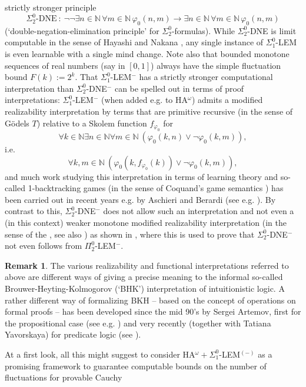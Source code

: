 \documentclass[1p]{elsarticle}
\newcommand{\NN}{\ensuremath{\mathbb{N}}}
\theoremstyle{plain}
\theoremstyle{definition}
\newtheorem{rmk}[thm]{Remark}
\theoremstyle{remark}
\theoremstyle{definition}
\begin{document}
strictly stronger principle 
\[ \Sigma^0_2\mbox{-DNE}\ :\ \neg\neg\exists n\in\NN\,\forall m\in\NN\,
\varphi_0(n,m)\to\exists n\in\NN\,\forall m\in\NN\,\varphi_0(n,m) \]
(`double-negation-elimination principle' for 
$\Sigma^0_2$-formulas). While $\Sigma^0_2$-DNE is limit computable in the 
sense of Hayashi and 
Nakana \cite{Hayashi/Nakata}, 
any single instance of $\Sigma^0_1$-LEM is even learnable 
with a single mind change. Note also that bounded monotone sequences of 
real numbers (say in $[0,1]$) always have the simple fluctuation bound 
$F(k):=2^k.$ That $\Sigma^0_1$-LEM$^-$ has a strictly stronger 
computational interpretation than $\Sigma^0_2$-DNE$^-$ can be spelled 
out in terms of proof interpretations:  $\Sigma^0_1$-LEM$^-$ (when added 
e.g. to HA$^{\omega}$) admits  
a modified realizability interpretation 
by terms that are primitive recursive (in the 
sense of G\"odels $T$) relative to a Skolem function $f_{\varphi_0}$ for 
\[ \forall k\in\NN\exists n \in\NN\forall m\in\NN 
\ (\varphi_0(k,n)\vee\neg\varphi_0(k,m)),\]
i.e. 
\[ \forall k,m\in\NN 
\ (\varphi_0(k,f_{\varphi_0}(k))\vee\neg\varphi_0(k,m)),  \] 
and much work studying this interpretation in terms of learning 
theory and so-called 1-backtracking games (in the sense of 
Coquand's game semantics \cite{Coquand,Berardi/Coquand/Hayashi}) 
has been carried out in recent years e.g. by 
Aschieri and Berardi (see e.g. 
\cite{Aschieri/Berardi,Aschieri1,Aschieri2}). By contrast to this, 
$\Sigma^0_2$-DNE$^-$ does not allow such an interpretation and not 
even a (in this context) weaker monotone modified realizability 
interpretation (in the sense of the \cite{Kohlenbach(relative)}, 
see also \cite{Kohlenbach(book)}) as shown in \cite{Akama}, where this 
is used to prove that $\Sigma^0_2$-DNE$^-$ not even follows from 
$\Pi^0_2$-LEM$^-$. 
\begin{rmk} The various realizability and functional interpretations 
referred to above are different ways of giving a precise meaning to the 
informal so-called Brouwer-Heyting-Kolmogorov (`BHK') 
interpretation of intuitionistic 
logic. A rather different way of formalizing BKH -- based on the concept 
of operations on formal proofs -- has been developed since 
the mid 90's by Sergei Artemov, first for the propositional case (see 
e.g. \cite{Artemov}) and very recently (together with 
Tatiana Yavorskaya) for predicate logic (see \cite{Artemov11}).
\end{rmk}
At a first look, all this might suggest to consider 
HA$^{\omega}+\Sigma^0_1$-LEM$^{(-)}$ as a promising framework to 
guarantee computable bounds on the number of fluctuations for provable Cauchy 
\end{document}
